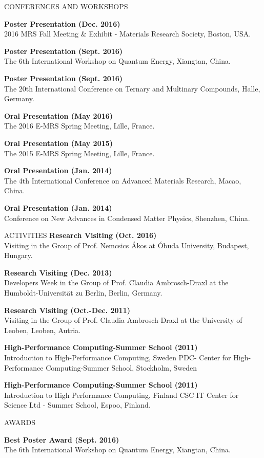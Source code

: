 \documentclass{resume} %
\begin{document}
\newpage

\begin{rSection}{CONFERENCES AND WORKSHOPS}

\textbf{Poster Presentation (Dec. 2016)} \\
2016 MRS Fall Meeting \& Exhibit - Materials Research Society, Boston, USA.

\textbf{Poster Presentation (Sept. 2016)} \\
The 6th International Workshop on Quantum Energy, Xiangtan, China.

\textbf{Poster Presentation (Sept. 2016)} \\
The 20th International Conference on Ternary and Multinary Compounds, Halle, Germany.

\textbf{Oral Presentation (May 2016)} \\
The 2016 E-MRS Spring Meeting, Lille, France.

\textbf{Oral Presentation (May 2015)} \\
The 2015 E-MRS Spring Meeting, Lille, France.

\textbf{Oral Presentation (Jan. 2014)} \\
The 4th International Conference on Advanced Materials Research, Macao, China.

\textbf{Oral Presentation (Jan. 2014)} \\
Conference on New Advances in Condensed Matter Physics, Shenzhen, China.




 
\end{rSection}

\begin{rSection}{ACTIVITIES}
\textbf{Research Visiting (Oct. 2016)} \\
Visiting in the Group of Prof. Nemcsics Ákos at Óbuda University, Budapest, Hungary.


\textbf{Research Visiting (Dec. 2013)} \\
Developers Week in the Group of Prof. Claudia Ambrosch-Draxl at the Humboldt-Universität zu Berlin, Berlin, Germany.

\textbf{Research Visiting (Oct.-Dec. 2011)} \\
Visiting in the Group of Prof. Claudia Ambrosch-Draxl at the University of Leoben, Leoben, Autria.

\textbf{High-Performance Computing-Summer School (2011)} \\
Introduction to High-Performance Computing, Sweden PDC- Center for High-Performance Computing-Summer School, Stockholm, Sweden

\textbf{High-Performance Computing-Summer School (2011)} \\
Introduction to High Performance Computing, Finland CSC IT Center for Science Ltd - Summer School, Espoo, Finland.

\end{rSection}


\begin{rSection}{AWARDS}

\textbf{Best Poster Award (Sept. 2016)} \\
The 6th International Workshop on Quantum Energy, Xiangtan, China.

\end{rSection}
\end{document}
